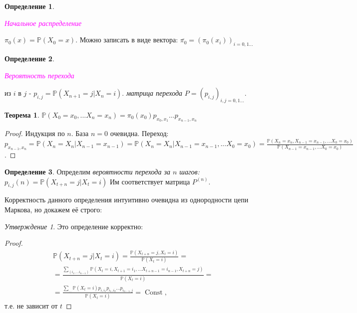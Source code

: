 \documentclass[a4paper,100pt]{article}
\theoremstyle{indented}
\newtheorem{theorem}{Теорема}
\theoremstyle{definition}
\newtheorem{defn}{Определение}
\theoremstyle{remark}
\newtheorem{stat}{Утверждение}
\DeclareMathOperator{\Const}{Const}
\begin{document}
\begin{defn}
  \hypertarget{n31}{\textcolor{magenta}{\textit{Начальное распределение}}} $\pi_0(x)=\mathbb{P}(X_0=x)$. Можно записать в виде вектора: $\overline{\pi_0}=(\pi_0(x_i))_{i=0, 1...}$
\end{defn}

\begin{defn}
  \hypertarget{n32}{\textcolor{magenta}{\textit{Вероятность перехода}}} из $i$ в $j$ - $p_{i, j}=\mathbb{P}(X_{n+1}=j | X_n=i)$. \textit{матрица перехода} $P=(p_{i, j})_{i, j=0, 1...}$. 
\end{defn}

\begin{theorem}
  $\mathbb{P}(X_0=x_0, ...X_n=x_n)=\pi_0(x_0)p_{x_0, x_1}...p_{x_{n-1}, x_n}$
\end{theorem}

\begin{proof}
Индукция по $n$. База $n=0$ очевидна. Переход: $p_{x_{n-1}, x_n}=\mathbb{P}(X_{n}=X_n | X_{n-1}=x_{n-1})=\mathbb{P}(X_{n}=X_n | X_{n-1}=x_{n-1}, ... X_0=x_0)= \frac{\mathbb{P} (X_n=x_n, X_{n-1}=x_{n-1}, ... X_0=x_0)}{\mathbb{P}(X_{n-1}=x_{n-1}, ... X_0=x_0)}$.
\end{proof}

\begin{defn}
Определим \textit{вероятности перехода за $n$ шагов:} $p_{i, j}(n)=\mathbb{P}(X_{t+n}=j | X_t=i)$ Им соответствует матрица $P^{(n)}$. 
\end{defn}

Корректность данного определения интуитивно очевидна из однородности цепи Маркова, но докажем её строго:

\begin{stat}
  Это определение корректно:
\end{stat}

\begin{proof}
\begin{equation*}
  \begin{aligned}
    & \mathbb{P}(X_{t+n}=j | X_t=i) =\frac{\mathbb{P}(X_{t+n}=j, X_t=i)}{\mathbb{P}(X_t=i)}= \\ 
    & = \frac{\sum_{(i_1, ...i_{n-1})}\mathbb{P}(X_t=i, X_{t+1}=i_1, ...X_{t+n-1}=i_{n-1}, X_{t+n}=j)}{\mathbb{P}(X_t=i)} = \\ 
    & = \frac{\sum_{\ldots}\mathbb{P}(X_t=i)p_{i, i_1}p_{i_1, i_2}...p_{i_{n-1}, j}}{\mathbb{P}(X_t=i)}=\Const, 
  \end{aligned}
\end{equation*}
т.е. не зависит от $t$
\end{proof}
\end{document}
